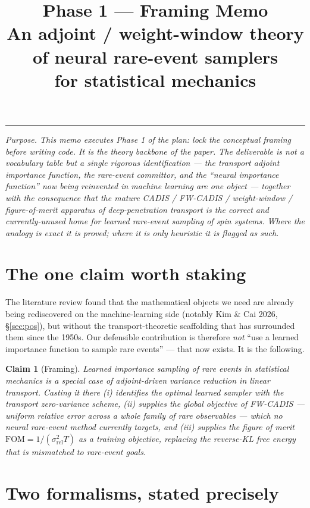 \documentclass[11pt]{article}
\title{\vspace{-1.2cm}\textbf{Phase 1 --- Framing Memo}\\[2pt]
\large An adjoint / weight-window theory of neural rare-event samplers\\
for statistical mechanics}
\author{}\date{}
\newtheorem{claim}{Claim}
\begin{document}
\maketitle
\vspace{-1.3cm}
\begin{center}\rule{0.62\textwidth}{0.4pt}\end{center}

\noindent\textit{Purpose. This memo executes Phase 1 of the plan: lock the conceptual framing
before writing code. It is the theory backbone of the paper. The deliverable is not a
vocabulary table but a single rigorous identification --- the transport adjoint importance
function, the rare-event committor, and the ``neural importance function'' now being
reinvented in machine learning are one object --- together with the consequence that the
mature CADIS / FW-CADIS / weight-window / figure-of-merit apparatus of deep-penetration
transport is the correct and currently-unused home for learned rare-event sampling of spin
systems. Where the analogy is exact it is proved; where it is only heuristic it is flagged
as such.}

\section{The one claim worth staking}
The literature review found that the mathematical objects we need are already being
rediscovered on the machine-learning side (notably Kim \& Cai 2026, \S\ref{sec:pos}), but
without the transport-theoretic scaffolding that has surrounded them since the 1950s. Our
defensible contribution is therefore \emph{not} ``use a learned importance function to
sample rare events'' --- that now exists. It is the following.

\begin{claim}[Framing]
Learned importance sampling of rare events in statistical mechanics is a special case of
adjoint-driven variance reduction in linear transport. Casting it there (i) identifies the
optimal learned sampler with the transport zero-variance scheme, (ii) supplies the
\emph{global} objective of \textup{FW-CADIS} --- uniform relative error across a whole
family of rare observables --- which no neural rare-event method currently targets, and
(iii) supplies the figure of merit $\mathrm{FOM}=1/(\sigma_{\mathrm{rel}}^2 T)$ as a
training objective, replacing the reverse-KL free energy that is mismatched to rare-event
goals.
\end{claim}

\section{Two formalisms, stated precisely}
\end{document}
